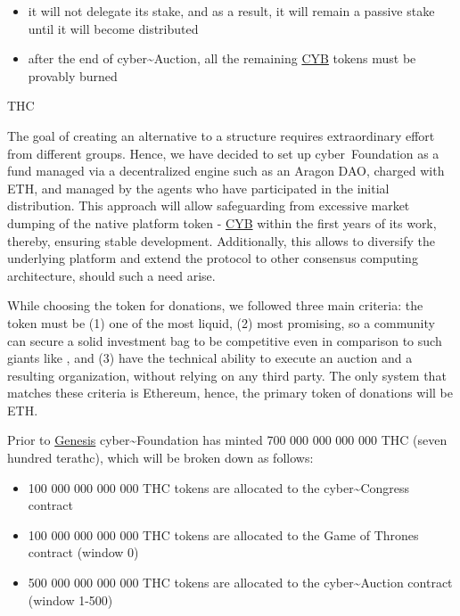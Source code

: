 \documentclass[8pt,oneside]{amsart}
\makeatletter
\newcommand{\linkred}[2]{\href{#1}{\color{red}{#2}}}
\renewcommand\subsection{\@startsection{subsection}
                                    {2}{\z@}
                                    {-3.25ex\@plus -1ex \@minus -.2ex}
                                    {0ex \@plus .2ex}
                                    {\play\Large}
                        }
\newcommand{\titleSection}[1]{\subsection{#1}}
\newenvironment{Figure}
  {\par\medskip\noindent\minipage{\linewidth}}
  {\endminipage\par\medskip}
\makeatother
\begin{document}
\begin{itemize}
\item it will not delegate its stake, and as a result, it will remain a passive stake until it will become distributed
\item after the end of cyber\~{}Auction, all the remaining {\hyperref[cyb]{CYB}} tokens must be provably burned
\end{itemize}

\titleSection{THC}\label{thc}

The goal of creating an alternative to a \linkred{https://google.com}{Google-like} structure requires extraordinary effort from different groups. Hence, we have decided to set up cyber~Foundation as a fund managed via a decentralized engine such as an Aragon DAO, charged with ETH, and managed by the agents who have participated in the initial distribution. This approach will allow safeguarding from excessive market dumping of the native platform token - {\hyperref[cyb]{CYB}} within the first years of its work, thereby, ensuring stable development. Additionally, this allows to diversify the underlying platform and extend the protocol to other consensus computing architecture, should such a need arise.

While choosing the token for donations, we followed three main criteria: the token must be (1) one of the most liquid, (2) most promising, so a community can secure a solid investment bag to be competitive even in comparison to such giants like \linkred{https://google.com}{Google}, and (3) have the technical ability to execute an auction and a resulting organization, without relying on any third party. The only system that matches these criteria is Ethereum, hence, the primary token of donations will be ETH.

Prior to \hyperlink{genesis}{Genesis} cyber\~{}Foundation has minted 700 000 000 000 000 THC (seven hundred terathc), which will be broken down as follows:

\begin{itemize}
\item 100 000 000 000 000 THC tokens are allocated to the cyber\~{}Congress contract
\item 100 000 000 000 000 THC tokens are allocated to the Game of Thrones contract (window 0)
\item 500 000 000 000 000 THC tokens are allocated to the cyber\~{}Auction contract (window 1-500)
\end{itemize}

\begin{Figure}
 \centering
 
\end{Figure}
\end{document}
